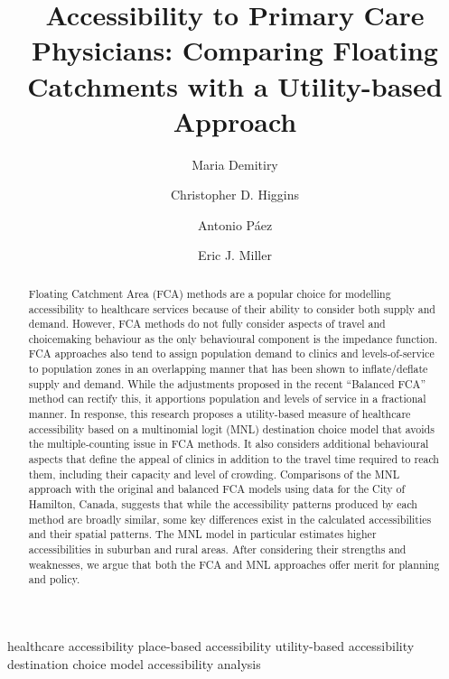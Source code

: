 \documentclass[]{elsarticle} %
\begin{document}
\begin{frontmatter}

  \title{Accessibility to Primary Care Physicians: Comparing Floating
Catchments with a Utility-based Approach}
    \author[University of Toronto]{Maria Demitiry}
    \author[University of Toronto Scarborough]{Christopher D.
Higgins}
    \author[McMaster University]{Antonio Páez}
    \author[University of Toronto]{Eric J. Miller}
      \address[University of Toronto]{Department of Civil and Mineral
Engineering, University of Toronto, 35 St.~George Street Toronto, ON.
Canada, M5S 1A4}
    \address[University of Toronto Scarborough]{Department of Human
Geography, 1265 Military Trail, Toronto, ON. Canada, M1C 1A4}
    \address[McMaster University]{School of Earth, Environment and
Society, McMaster University, 1280 Main St W, Hamilton, ON. Canada, L8S
4K1}
  
  \begin{abstract}
  Floating Catchment Area (FCA) methods are a popular choice for
  modelling accessibility to healthcare services because of their
  ability to consider both supply and demand. However, FCA methods do
  not fully consider aspects of travel and choicemaking behaviour as the
  only behavioural component is the impedance function. FCA approaches
  also tend to assign population demand to clinics and levels-of-service
  to population zones in an overlapping manner that has been shown to
  inflate/deflate supply and demand. While the adjustments proposed in
  the recent ``Balanced FCA'' method can rectify this, it apportions
  population and levels of service in a fractional manner. In response,
  this research proposes a utility-based measure of healthcare
  accessibility based on a multinomial logit (MNL) destination choice
  model that avoids the multiple-counting issue in FCA methods. It also
  considers additional behavioural aspects that define the appeal of
  clinics in addition to the travel time required to reach them,
  including their capacity and level of crowding. Comparisons of the MNL
  approach with the original and balanced FCA models using data for the
  City of Hamilton, Canada, suggests that while the accessibility
  patterns produced by each method are broadly similar, some key
  differences exist in the calculated accessibilities and their spatial
  patterns. The MNL model in particular estimates higher accessibilities
  in suburban and rural areas. After considering their strengths and
  weaknesses, we argue that both the FCA and MNL approaches offer merit
  for planning and policy.
  \end{abstract}
   \begin{keyword} healthcare accessibility place-based
accessibility utility-based accessibility destination choice
model accessibility analysis\end{keyword}
 \end{frontmatter}
\end{document}
